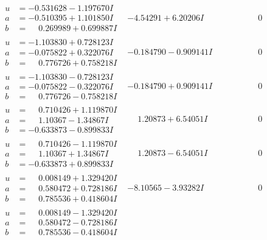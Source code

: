 \documentclass[1p]{elsarticle_modified}
\theoremstyle{definition}
\begin{document}
$$\begin{array}{c|c|c}
\begin{aligned}
u &= -0.531628 - 1.197670 I \\
a &= -0.510395 + 1.101850 I \\
b &= \phantom{-}0.269989 + 0.699887 I\end{aligned}
 & -4.54291 + 6.20206 I & \phantom{-0.000000 } 0 \\ \hline\begin{aligned}
u &= -1.103830 + 0.728123 I \\
a &= -0.075822 + 0.322076 I \\
b &= \phantom{-}0.776726 + 0.758218 I\end{aligned}
 & -0.184790 - 0.909141 I & \phantom{-0.000000 } 0 \\ \hline\begin{aligned}
u &= -1.103830 - 0.728123 I \\
a &= -0.075822 - 0.322076 I \\
b &= \phantom{-}0.776726 - 0.758218 I\end{aligned}
 & -0.184790 + 0.909141 I & \phantom{-0.000000 } 0 \\ \hline\begin{aligned}
u &= \phantom{-}0.710426 + 1.119870 I \\
a &= \phantom{-}1.10367 - 1.34867 I \\
b &= -0.633873 - 0.899833 I\end{aligned}
 & \phantom{-}1.20873 + 6.54051 I & \phantom{-0.000000 } 0 \\ \hline\begin{aligned}
u &= \phantom{-}0.710426 - 1.119870 I \\
a &= \phantom{-}1.10367 + 1.34867 I \\
b &= -0.633873 + 0.899833 I\end{aligned}
 & \phantom{-}1.20873 - 6.54051 I & \phantom{-0.000000 } 0 \\ \hline\begin{aligned}
u &= \phantom{-}0.008149 + 1.329420 I \\
a &= \phantom{-}0.580472 + 0.728186 I \\
b &= \phantom{-}0.785536 + 0.418604 I\end{aligned}
 & -8.10565 - 3.93282 I & \phantom{-0.000000 } 0 \\ \hline\begin{aligned}
u &= \phantom{-}0.008149 - 1.329420 I \\
a &= \phantom{-}0.580472 - 0.728186 I \\
b &= \phantom{-}0.785536 - 0.418604 I\end{aligned}

\end{array}$$
\end{document}
